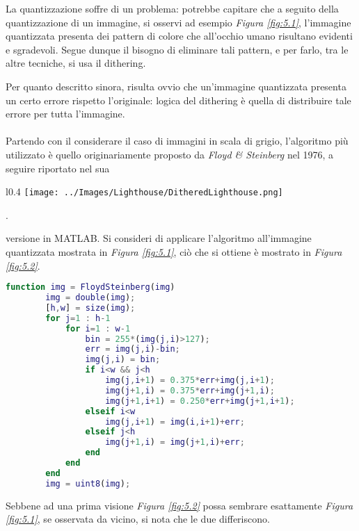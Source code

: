 \documentclass{subfiles}
\begin{document}
La quantizzazione soffre di un problema: potrebbe capitare che a seguito della quantizzazione di un immagine, si osservi ad esempio \emph{Figura \ref{fig:5.1}},
l'immagine quantizzata presenta dei pattern di colore che all'occhio umano risultano evidenti e sgradevoli.
Segue dunque il bisogno di eliminare tali pattern, e per farlo, tra le altre tecniche, si usa il dithering.

Per quanto descritto sinora, risulta ovvio che un'immagine quantizzata presenta un certo errore rispetto l'originale:
logica del dithering è quella di distribuire tale errore per tutta l'immagine.
\\ \\
Partendo con il considerare il caso di immagini in scala di grigio, l'algoritmo più utilizzato è quello originariamente proposto da \emph{Floyd \emph{\&} Steinberg} nel 1976,
a seguire riportato nel sua
\begin{wrapfigure}{l}{0.4\textwidth}
    \centering
    \texttt{[image: ../Images/Lighthouse/DitheredLighthouse.png]}
    \caption{Applicazione dell'algoritmo di Floyd-Steinberg a \emph{Figura \ref{fig:5.1}}}.
    \label{fig:5.2}
\end{wrapfigure}
versione in MATLAB. Si consideri di applicare l'algoritmo all'immagine quantizzata mostrata in \emph{Figura \ref{fig:5.1}},
ciò che si ottiene è mostrato in \emph{Figura \ref{fig:5.2}}.
\begin{center}
    \begin{lstlisting}[language = MATLAB]
        function img = FloydSteinberg(img)
        img = double(img);
        [h,w] = size(img);
        for j=1 : h-1
            for i=1 : w-1
                bin = 255*(img(j,i)>127);
                err = img(j,i)-bin;
                img(j,i) = bin;
                if i<w && j<h
                    img(j,i+1) = 0.375*err+img(j,i+1);
                    img(j+1,i) = 0.375*err+img(j+1,i);
                    img(j+1,i+1) = 0.250*err+img(j+1,i+1);
                elseif i<w
                    img(j,i+1) = img(i,i+1)+err;
                elseif j<h
                    img(j+1,i) = img(j+1,i)+err;
                end
            end
        end
        img = uint8(img);
    \end{lstlisting}
\end{center}
\clearpage

Sebbene ad una prima visione \emph{Figura \ref{fig:5.2} } possa sembrare esattamente \emph{Figura \ref{fig:5.1}}, se osservata da vicino, si nota che le due differiscono.
\end{document}

